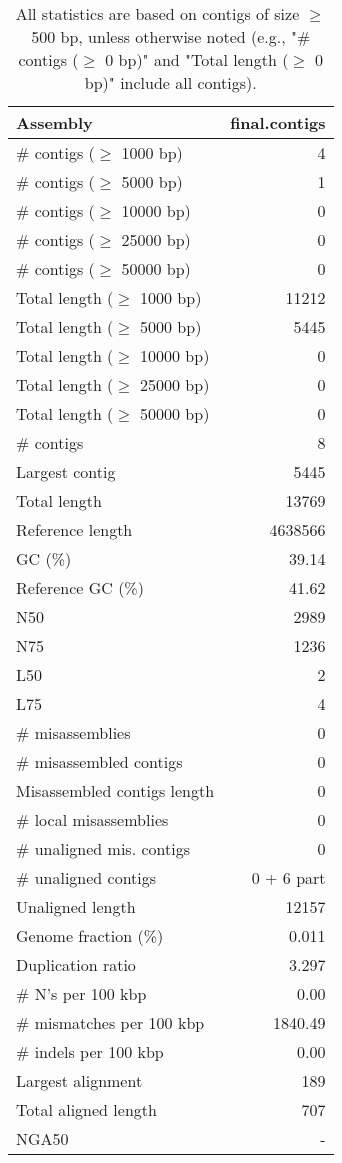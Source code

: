 \documentclass[12pt,a4paper]{article}
\begin{document}
\begin{table}[ht]
\begin{center}
\caption{All statistics are based on contigs of size $\geq$ 500 bp, unless otherwise noted (e.g., "\# contigs ($\geq$ 0 bp)" and "Total length ($\geq$ 0 bp)" include all contigs).}
\begin{tabular}{|l*{1}{|r}|}
\hline
Assembly & final.contigs \\ \hline
\# contigs ($\geq$ 1000 bp) & 4 \\ \hline
\# contigs ($\geq$ 5000 bp) & 1 \\ \hline
\# contigs ($\geq$ 10000 bp) & 0 \\ \hline
\# contigs ($\geq$ 25000 bp) & 0 \\ \hline
\# contigs ($\geq$ 50000 bp) & 0 \\ \hline
Total length ($\geq$ 1000 bp) & 11212 \\ \hline
Total length ($\geq$ 5000 bp) & 5445 \\ \hline
Total length ($\geq$ 10000 bp) & 0 \\ \hline
Total length ($\geq$ 25000 bp) & 0 \\ \hline
Total length ($\geq$ 50000 bp) & 0 \\ \hline
\# contigs & 8 \\ \hline
Largest contig & 5445 \\ \hline
Total length & 13769 \\ \hline
Reference length & 4638566 \\ \hline
GC (\%) & 39.14 \\ \hline
Reference GC (\%) & 41.62 \\ \hline
N50 & 2989 \\ \hline
N75 & 1236 \\ \hline
L50 & 2 \\ \hline
L75 & 4 \\ \hline
\# misassemblies & 0 \\ \hline
\# misassembled contigs & 0 \\ \hline
Misassembled contigs length & 0 \\ \hline
\# local misassemblies & 0 \\ \hline
\# unaligned mis. contigs & 0 \\ \hline
\# unaligned contigs & 0 + 6 part \\ \hline
Unaligned length & 12157 \\ \hline
Genome fraction (\%) & 0.011 \\ \hline
Duplication ratio & 3.297 \\ \hline
\# N's per 100 kbp & 0.00 \\ \hline
\# mismatches per 100 kbp & 1840.49 \\ \hline
\# indels per 100 kbp & 0.00 \\ \hline
Largest alignment & 189 \\ \hline
Total aligned length & 707 \\ \hline
NGA50 & - \\ \hline
\end{tabular}
\end{center}
\end{table}
\end{document}
